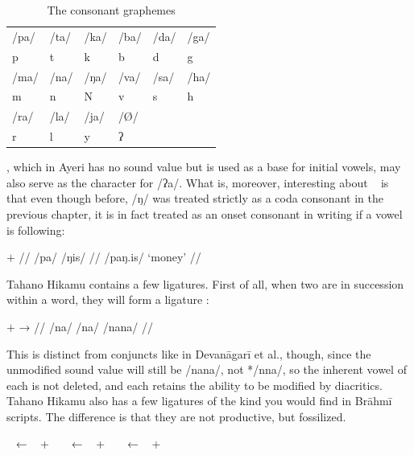 \begin{table}[t]
\caption{The consonant graphemes}

\begin{tabu} to \linewidth{X[c] X[c] X[c] X[c] X[c] X[c]}
\toprule
\tableheaderfont	/pa/ & /ta/ & /ka/ & /ba/ & /da/ & /ga/ \\
\rowfont{\Tagati\huge}	p & t & k & b & d & g \\

\midrule

\tableheaderfont	/ma/ & /na/ & /ŋa/ & /va/ & /sa/ & /ha/ \\
\rowfont{\Tagati\huge}	m & n & N & v & s & h \\

\midrule

\tableheaderfont	/ra/ & /la/ & /ja/ & /Ø/ \\
\rowfont{\Tagati\huge}	r & l & y & ʔ \\

\bottomrule
\end{tabu}
\label{tab:thcons}
\end{table}

, which in Ayeri has no sound value but is used as a base for initial
vowels, may also serve as the character for /ʔa/. What is, moreover,
interesting about ~ is that even though before, /ŋ/ was
treated strictly as a coda consonant in the previous chapter, it is in fact
treated as an onset consonant in writing if a vowel is following:

\ex[lingstyle=thex]\begingl
	\gla {}	$+$	 //
	\glb /pa/	{}	/ŋis/ //
	\glft {} /paŋ.is/ `money' //
\endgl\xe

Tahano Hikamu contains a few ligatures. First of all, when two 
 are in succession within a word, they will form a ligature 
:

\ex[lingstyle=thex]\begingl
	\gla {}	$+$		→	 //
	\glb /na/	{}	/na/	{}	/nana/ //
\endgl\xe

This is distinct from conjuncts like in Devanāgarī et al., though, since the
unmodified sound value will still be /nana/, not */nna/, so the inherent vowel
of each   is not deleted, and each   retains
the ability to be modified by diacritics. Tahano Hikamu also has a few
ligatures of the kind you would find in Brāhmī scripts. The difference is that
they are not productive, but fossilized.

\pex
	\a {}~ ← ~ + 
		~
	\a {}~ ← ~ + 
		~
	\a {}~ ← ~ + 
		~
\xe

